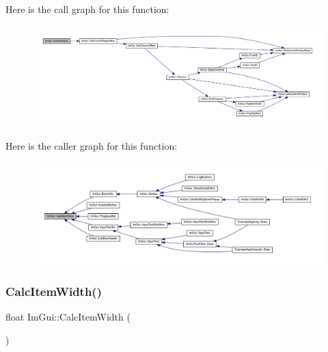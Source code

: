 Here is the call graph for this function\+:
\nopagebreak
\begin{figure}[H]
\begin{center}
\leavevmode
\includegraphics[width=350pt]{namespace_im_gui_a3c1505e785f9571ed82500692a727c5f_cgraph}
\end{center}
\end{figure}
Here is the caller graph for this function\+:
\nopagebreak
\begin{figure}[H]
\begin{center}
\leavevmode
\includegraphics[width=350pt]{namespace_im_gui_a3c1505e785f9571ed82500692a727c5f_icgraph}
\end{center}
\end{figure}
\mbox{\label{namespace_im_gui_ab3b3ba92ebd8bca4a552dd93321a1994}} 
\subsubsection{\texorpdfstring{Calc\+Item\+Width()}{CalcItemWidth()}}
{\footnotesize\ttfamily float Im\+Gui\+::\+Calc\+Item\+Width (\begin{DoxyParamCaption}{ }\end{DoxyParamCaption})}

